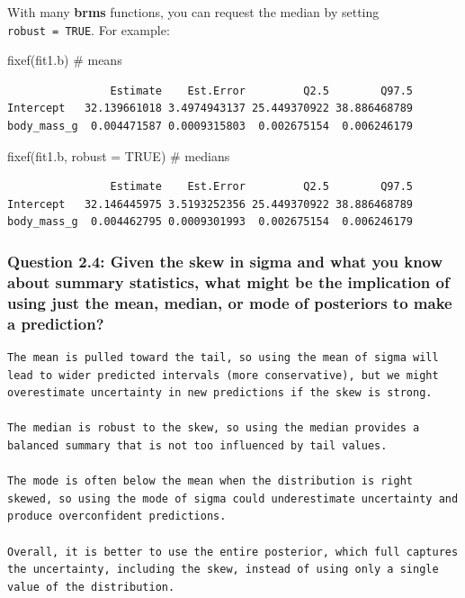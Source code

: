 \documentclass[
  letterpaper,
  DIV=11,
  numbers=noendperiod]{scrartcl}
\newenvironment{Shaded}{\begin{snugshade}}{\end{snugshade}}
\newcommand{\AttributeTok}[1]{\textcolor[rgb]{0.40,0.45,0.13}{#1}}
\newcommand{\CommentTok}[1]{\textcolor[rgb]{0.37,0.37,0.37}{#1}}
\newcommand{\ConstantTok}[1]{\textcolor[rgb]{0.56,0.35,0.01}{#1}}
\newcommand{\FunctionTok}[1]{\textcolor[rgb]{0.28,0.35,0.67}{#1}}
\newcommand{\NormalTok}[1]{\textcolor[rgb]{0.00,0.23,0.31}{#1}}
\begin{document}
With many \textbf{brms} functions, you can request the median by setting
\texttt{robust\ =\ TRUE}. For example:

\begin{Shaded}
\begin{Highlighting}[]
\FunctionTok{fixef}\NormalTok{(fit1.b)                 }\CommentTok{\# means}
\end{Highlighting}
\end{Shaded}

\begin{verbatim}
                Estimate    Est.Error         Q2.5        Q97.5
Intercept   32.139661018 3.4974943137 25.449370922 38.886468789
body_mass_g  0.004471587 0.0009315803  0.002675154  0.006246179
\end{verbatim}

\begin{Shaded}
\begin{Highlighting}[]
\FunctionTok{fixef}\NormalTok{(fit1.b, }\AttributeTok{robust =} \ConstantTok{TRUE}\NormalTok{)  }\CommentTok{\# medians}
\end{Highlighting}
\end{Shaded}

\begin{verbatim}
                Estimate    Est.Error         Q2.5        Q97.5
Intercept   32.146445975 3.5193252356 25.449370922 38.886468789
body_mass_g  0.004462795 0.0009301993  0.002675154  0.006246179
\end{verbatim}

\subsubsection{Question 2.4: Given the skew in sigma and what you know
about summary statistics, what might be the implication of using just
the mean, median, or mode of posteriors to make a
prediction?}\label{question-2.4-given-the-skew-in-sigma-and-what-you-know-about-summary-statistics-what-might-be-the-implication-of-using-just-the-mean-median-or-mode-of-posteriors-to-make-a-prediction}

\begin{verbatim}
The mean is pulled toward the tail, so using the mean of sigma will lead to wider predicted intervals (more conservative), but we might overestimate uncertainty in new predictions if the skew is strong.

The median is robust to the skew, so using the median provides a balanced summary that is not too influenced by tail values.

The mode is often below the mean when the distribution is right skewed, so using the mode of sigma could underestimate uncertainty and produce overconfident predictions.

Overall, it is better to use the entire posterior, which full captures the uncertainty, including the skew, instead of using only a single value of the distribution.
\end{verbatim}
\end{document}
